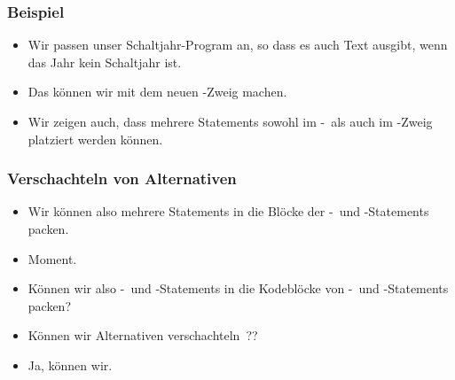 \documentclass[aspectratio=169,mathserif,notheorems]{beamer}%
\begin{document}
\begin{frame}[t]%
\frametitle{Beispiel}%
%
\parbox{0.4\paperwidth}{\small{%
\begin{itemize}%
%
\item Wir passen unser Schaltjahr-Program an, so dass es auch Text ausgibt, wenn das Jahr kein Schaltjahr ist.%
%
\item<2-> Das können wir mit dem neuen -Zweig machen.%
%
\item<3-> Wir zeigen auch, dass mehrere Statements sowohl im -\ als auch im -Zweig platziert werden können.%
\end{itemize}%
}}%
%
%
%
\end{frame}%
%
\begin{frame}%
\frametitle{Verschachteln von Alternativen}%
\begin{itemize}%
\item Wir können also mehrere Statements in die Blöcke der -\ und -Statements packen.%
%
\item<2-> Moment. %
%
\item<5-> Können wir also -\ und -Statements in die Kodeblöcke von -\ und -Statements packen?%
%
\item<6-> Können wir Alternativen verschachteln~??%
%
\item<7-> Ja, können wir.%
\end{itemize}%
\end{frame}%
%
\end{document}
